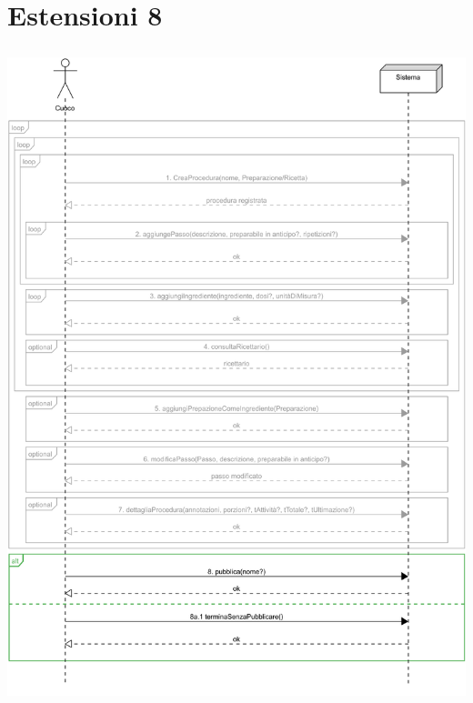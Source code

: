 \section*{Estensioni 8}
\includegraphics[max width=\textwidth, max height=190mm]{../resources/img/GRP/SSD/ext8.png}
\RaggedRight